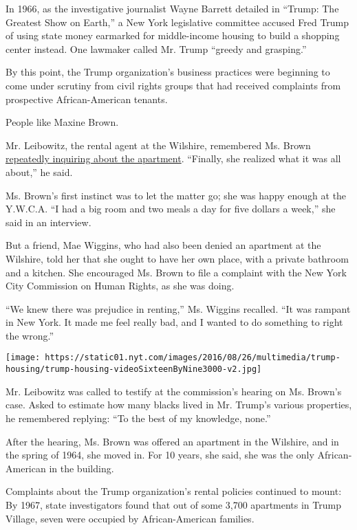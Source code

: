 In 1966, as the investigative journalist Wayne Barrett detailed in
``Trump: The Greatest Show on Earth,'' a New York legislative committee
accused Fred Trump of using state money earmarked for middle-income
housing to build a shopping center instead. One lawmaker called Mr.
Trump ``greedy and grasping.''

By this point, the Trump organization's business practices were
beginning to come under scrutiny from civil rights groups that had
received complaints from prospective African-American tenants.

People like Maxine Brown.

Mr. Leibowitz, the rental agent at the Wilshire, remembered Ms. Brown
\href{http://www.nytimes.com/interactive/2016/08/27/us/politics/maxine-brown.html}{repeatedly
inquiring about the apartment}. ``Finally, she realized what it was all
about,'' he said.

Ms. Brown's first instinct was to let the matter go; she was happy
enough at the Y.W.C.A. ``I had a big room and two meals a day for five
dollars a week,'' she said in an interview.

But a friend, Mae Wiggins, who had also been denied an apartment at the
Wilshire, told her that she ought to have her own place, with a private
bathroom and a kitchen. She encouraged Ms. Brown to file a complaint
with the New York City Commission on Human Rights, as she was doing.

``We knew there was prejudice in renting,'' Ms. Wiggins recalled. ``It
was rampant in New York. It made me feel really bad, and I wanted to do
something to right the wrong.''

\texttt{[image: https://static01.nyt.com/images/2016/08/26/multimedia/trump-housing/trump-housing-videoSixteenByNine3000-v2.jpg]}

Mr. Leibowitz was called to testify at the commission's hearing on Ms.
Brown's case. Asked to estimate how many blacks lived in Mr. Trump's
various properties, he remembered replying: ``To the best of my
knowledge, none.''

After the hearing, Ms. Brown was offered an apartment in the Wilshire,
and in the spring of 1964, she moved in. For 10 years, she said, she was
the only African-American in the building.

Complaints about the Trump organization's rental policies continued to
mount: By 1967, state investigators found that out of some 3,700
apartments in Trump Village, seven were occupied by African-American
families.

